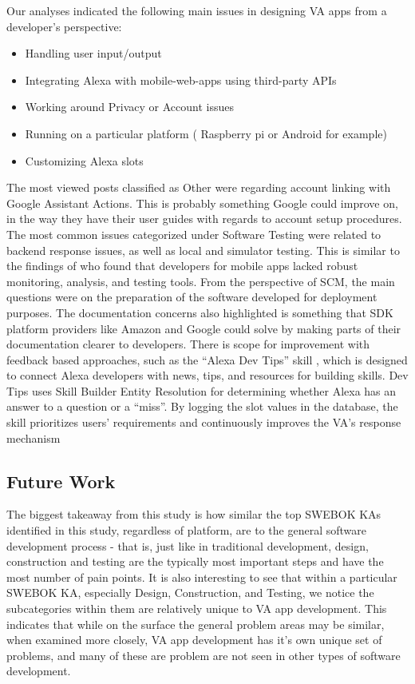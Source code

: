 \documentclass{sigchi}
\begin{document}
Our analyses indicated the following main issues in designing VA apps from a developer's perspective:
\begin{itemize}
\item Handling user input/output
\item Integrating Alexa with mobile-web-apps using third-party APIs
\item Working around Privacy or Account issues
\item Running on a particular platform ( Raspberry pi or Android for example)
\item Customizing Alexa slots
\end{itemize}

The most viewed posts classified as Other were regarding account linking with Google Assistant Actions. This is probably something Google could improve on, in the way they have their user guides with regards to account setup procedures. The most common issues categorized under Software Testing were related to backend response issues, as well as local and simulator testing. This is similar to the findings of \cite{4joorabchi2013real} who found that developers for mobile apps lacked robust monitoring, analysis, and testing tools. From the perspective of SCM, the main questions were on the preparation of the software developed for deployment purposes. The documentation concerns also highlighted is something that SDK platform providers like Amazon and Google could solve by making parts of their documentation clearer to developers. 
There is scope for  improvement with feedback based approaches, such as the ``Alexa Dev Tips'' skill \cite{AlexaDevTips}, which is designed to connect Alexa developers with news, tips, and resources for building skills. Dev Tips uses Skill Builder Entity Resolution for determining whether Alexa has an answer to a question or a ``miss''. By logging the slot values in the database, the skill prioritizes users' requirements and continuously improves the VA's response mechanism
\subsection{Future Work}
The biggest takeaway from this study is how similar the top SWEBOK KAs identified in this study, regardless of platform, are to the general software development process - that is, just like in traditional development, design, construction and testing are the typically most important steps and have the most number of pain points. It is also interesting to see that within a particular SWEBOK KA, especially Design, Construction, and Testing, we notice the subcategories within them are relatively unique to VA app development. This indicates that while on the surface the general problem areas may be similar, when examined more closely, VA app development has it's own unique set of problems, and many of these are problem are not seen in other types of software development.
\end{document}
